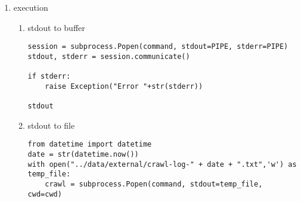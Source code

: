 \documentclass[11pt]{article}
\begin{document}
\begin{enumerate}
\begin{enumerate}
\begin{enumerate}
\item execution
\label{sec:orge18a6a6}
\begin{enumerate}
\item stdout to buffer
\label{sec:org2ce2d87}
\begin{verbatim}
session = subprocess.Popen(command, stdout=PIPE, stderr=PIPE)
stdout, stderr = session.communicate()

if stderr:
    raise Exception("Error "+str(stderr))

stdout
\end{verbatim}

\item stdout to file
\label{sec:org66f6069}
\begin{verbatim}
from datetime import datetime
date = str(datetime.now())
with open("../data/external/crawl-log-" + date + ".txt",'w') as temp_file:
    crawl = subprocess.Popen(command, stdout=temp_file, cwd=cwd)
\end{verbatim}
\end{enumerate}
\end{enumerate}
\end{enumerate}
\end{enumerate}
\end{document}
